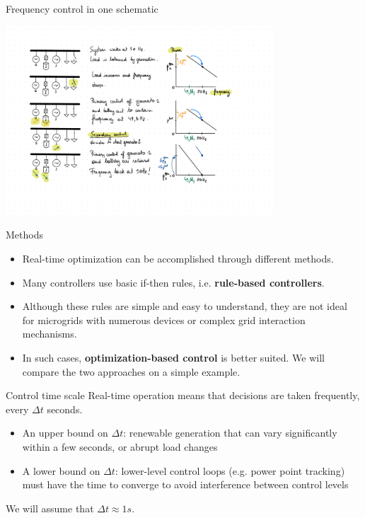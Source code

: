 \begin{frame}{Frequency control in one schematic}
    \begin{center}
        \includegraphics[width=0.75\textwidth, clip, trim=2cm 2cm 2cm 1cm]{images/primary_control.pdf}    
    \end{center}
\end{frame}

\begin{frame} {Methods}
\begin{itemize}
\item  Real-time optimization can be accomplished through different methods. 
\item Many controllers use basic if-then rules, i.e. \textbf{rule-based controllers}. 
\item Although these rules are simple and easy to understand, they are not ideal for microgrids with numerous devices or complex grid interaction mechanisms. 
\item In such cases, \textbf{optimization-based control} is better suited. We will compare the two approaches on a simple example.
\end{itemize}
\end{frame}

\begin{frame}{Control time scale}
    Real-time operation means that decisions are taken frequently, every $\Delta t$ seconds.
    \begin{itemize}
        \item An upper bound on $\Delta t$: renewable generation that can vary significantly within a few seconds, or abrupt load changes
        \item A lower bound on $\Delta t$: lower-level control loops (e.g. power point tracking) must have the time to converge to avoid interference between control levels
    \end{itemize}

    We will assume that $\Delta t \approx 1 s$.
\end{frame}

